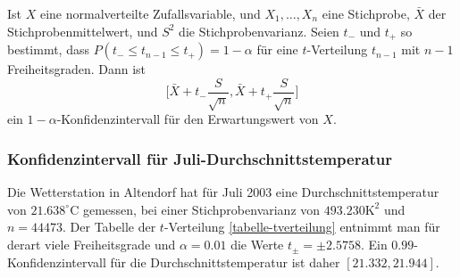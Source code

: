 \begin{satz}
Ist $X$ eine normalverteilte Zufallsvariable, und $X_1,\dots,X_n$ eine
Stichprobe, $\bar X$ der Stichprobenmittelwert, 
und $S^2$ die Stichprobenvarianz.
Seien $t_-$ und $t_+$ so bestimmt, dass
$P(t_-\le t_{n-1}\le t_+)=1-\alpha$ für eine $t$-Verteilung $t_{n-1}$ mit
$n-1$ Freiheitsgraden.
Dann ist
\begin{equation}
\biggl[\bar X+t_-\frac{S}{\sqrt{n}},\bar X+t_+\frac{S}{\sqrt{n}}\biggr]
\end{equation}
ein $1-\alpha$-Konfidenzintervall für den Erwartungswert von $X$.
\end{satz}

\subsubsection{Konfidenzintervall für Juli-Durchschnittstemperatur}
Die Wetterstation in Altendorf hat für Juli 2003 eine Durchschnittstemperatur
von $21.638^\circ\text{C}$ gemessen, bei einer Stichprobenvarianz von
$493.230\text{K}^2$ und $n=44473$.
Der Tabelle der $t$-Verteilung
\ref{tabelle-tverteilung} entnimmt man 
für derart
viele Freiheitsgrade und $\alpha=0.01$ die Werte
$t_{\pm}=\pm2.5758$.
Ein $0.99$-Konfidenzintervall für die
Durchschnittstemperatur ist daher
$[21.332, 21.944]$.

